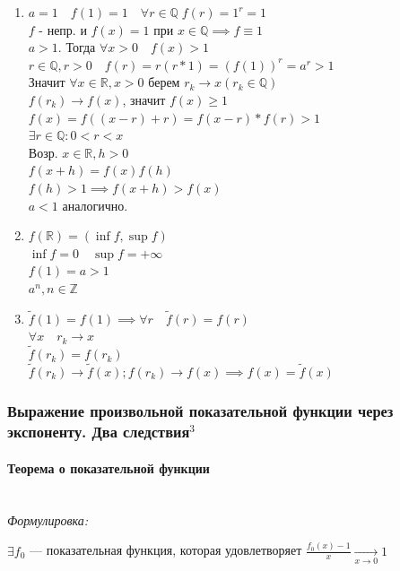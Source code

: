 \documentclass{article}
\let\vanillaparagraph\paragraph
\renewcommand{\paragraph}[1]{\vanillaparagraph{#1}\mbox{}\\}
\begin{document}
\begin{enumerate}
    \item $a=1 \quad f(1)=1 \quad \forall r \in \mathbb{Q} \; f(r) = 1^r = 1$\\
    $f$ - непр. и $f(x) = 1$ при $x \in \mathbb{Q} \implies f \equiv 1$ \\
    $a > 1$. Тогда $\forall x > 0 \quad f(x) > 1$ \\
    $r \in \mathbb{Q}, r > 0 \quad f(r) = r(r*1) = (f(1))^r=a^r>1$\\
    Значит $\forall x \in \mathbb{R}, x > 0$ берем $r_k \rightarrow x(r_k \in \mathbb{Q})$\\
    $f(r_k) \rightarrow f(x)$, значит $f(x) \ge 1$\\
    $f(x) = f((x-r)+r)=f(x-r)*f(r) > 1$\\
    $\exists r \in \mathbb{Q} : 0 < r < x$\\
    Возр. $x \in \mathbb{R}, h > 0$\\
    $f(x+h) = f(x) f(h)$\\
    $f(h) > 1 \implies f(x+h) > f(x)$\\
    $a<1$ аналогично.
    
    \item $f(\mathbb{R}) = (\inf{f}, \sup{f})$\\
    $\inf{f} = 0 \quad \sup{f} = +\infty$\\
    $f(1) = a > 1$\\
    $a^n, n\in \mathbb{Z}$
    
    \item $\tilde f(1) = f(1) \implies \forall r \quad \tilde f(r) = f(r)$\\
    $\forall x \quad r_k \rightarrow x$\\
    $\tilde f(r_k) = f(r_k)$\\
    $\tilde f(r_k) \rightarrow \tilde f(x); f(r_k) \rightarrow f(x) \implies f(x) = \tilde f(x)$
\end{enumerate}

\subsubsection{Выражение произвольной показательной функции через экспоненту. Два следствия\texorpdfstring{$^3$}{}}
\paragraph{Теорема о показательной функции}
\textit{Формулировка:}

$\exists f_0$ --- показательная функция, которая удовлетворяет $\frac{f_0(x) - 1} {x} \xrightarrow[x\to 0]{} 1$
\end{document}
